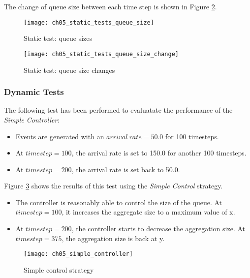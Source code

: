 The change of queue size between each time step is shown in Figure \ref{fig:ch5_static_tests_queue_size_change}.

\begin{figure}[htpb]
	\centering
	\texttt{[image: ch05\_static\_tests\_queue\_size]}
	\caption{Static test: queue sizes}
	\label{fig:ch5_static_tests_queue_size}
\end{figure}

\begin{figure}[htpb]
	\centering
	\texttt{[image: ch05\_static\_tests\_queue\_size\_change]}
	\caption{Static test: queue size changes}
	\label{fig:ch5_static_tests_queue_size_change}
\end{figure}

\subsubsection{Dynamic Tests}

The following test has been performed to evaluatate the performance of the \emph{Simple Controller}:

\begin{itemize}
	\item Events are generated with an $arrival\ rate = 50.0$ for 100 timesteps. 
	\item At $timestep = 100$, the arrival rate is set to 150.0 for another 100 timesteps. 
	\item At $timestep = 200$, the arrival rate is set back to 50.0.
\end{itemize}

Figure \ref{fig:ch5_dynamic_test_simple_controller} shows the results of this test using the \emph{Simple Control} strategy.

\begin{itemize}
	\item The controller is reasonably able to control the size of the queue. At $timestep = 100$, it increases the aggregate size to a maximum value of x. 
	\item At $timestep = 200$, the controller starts to decrease the aggregation size. At $timestep = 375$, the aggregation size is back at y.
\end{itemize}

\begin{figure}[htpb]
	\centering
	\texttt{[image: ch05\_simple\_controller]}
	\caption{Simple control strategy}
	\label{fig:ch5_dynamic_test_simple_controller}
\end{figure}

